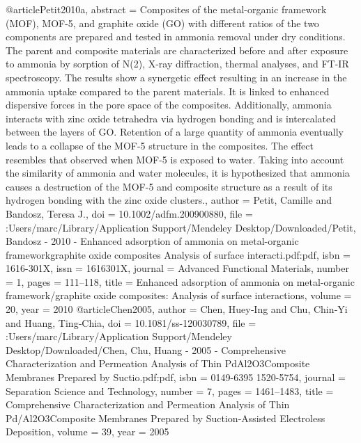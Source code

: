 @article{Petit2010a,
abstract = {Composites of the metal-organic framework (MOF), MOF-5, and graphite oxide (GO) with different ratios of the two components are prepared and tested in ammonia removal under dry conditions. The parent and composite materials are characterized before and after exposure to ammonia by sorption of N(2), X-ray diffraction, thermal analyses, and FT-IR spectroscopy. The results show a synergetic effect resulting in an increase in the ammonia uptake compared to the parent materials. It is linked to enhanced dispersive forces in the pore space of the composites. Additionally, ammonia interacts with zinc oxide tetrahedra via hydrogen bonding and is intercalated between the layers of GO. Retention of a large quantity of ammonia eventually leads to a collapse of the MOF-5 structure in the composites. The effect resembles that observed when MOF-5 is exposed to water. Taking into account the similarity of ammonia and water molecules, it is hypothesized that ammonia causes a destruction of the MOF-5 and composite structure as a result of its hydrogen bonding with the zinc oxide clusters.},
author = {Petit, Camille and Bandosz, Teresa J.},
doi = {10.1002/adfm.200900880},
file = {:Users/marc/Library/Application Support/Mendeley Desktop/Downloaded/Petit, Bandosz - 2010 - Enhanced adsorption of ammonia on metal-organic frameworkgraphite oxide composites Analysis of surface interacti.pdf:pdf},
isbn = {1616-301X},
issn = {1616301X},
journal = {Advanced Functional Materials},
number = {1},
pages = {111--118},
title = {{Enhanced adsorption of ammonia on metal-organic framework/graphite oxide composites: Analysis of surface interactions}},
volume = {20},
year = {2010}
}
@article{Chen2005,
author = {Chen, Huey‐Ing and Chu, Chin‐Yi and Huang, Ting‐Chia},
doi = {10.1081/ss-120030789},
file = {:Users/marc/Library/Application Support/Mendeley Desktop/Downloaded/Chen, Chu, Huang - 2005 - Comprehensive Characterization and Permeation Analysis of Thin PdAl2O3Composite Membranes Prepared by Suctio.pdf:pdf},
isbn = {0149-6395
1520-5754},
journal = {Separation Science and Technology},
number = {7},
pages = {1461--1483},
title = {{Comprehensive Characterization and Permeation Analysis of Thin Pd/Al2O3Composite Membranes Prepared by Suction‐Assisted Electroless Deposition}},
volume = {39},
year = {2005}
}

